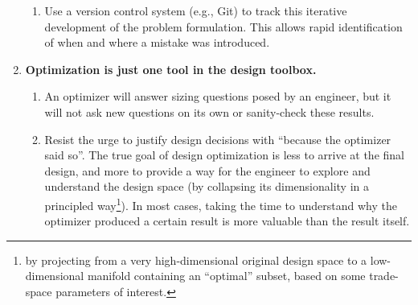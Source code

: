 \begin{enumerate}
\begin{enumerate}
        \item Use a version control system (e.g., Git) to track this iterative development of the problem formulation. This allows rapid identification of when and where a mistake was introduced.
    \end{enumerate}
    \item \textbf{Optimization is just one tool in the design toolbox.}
    \begin{enumerate}
        \item An optimizer will answer sizing questions posed by an engineer, but it will not ask new questions on its own or sanity-check these results.
        \item Resist the urge to justify design decisions with ``because the optimizer said so''. The true goal of design optimization is less to arrive at the final design, and more to provide a way for the engineer to explore and understand the design space (by collapsing its dimensionality in a principled way\footnote{by projecting from a very high-dimensional original design space to a low-dimensional manifold containing an ``optimal'' subset, based on some trade-space parameters of interest.}). In most cases, taking the time to understand why the optimizer produced a certain result is more valuable than the result itself.
    \end{enumerate}
\end{enumerate}